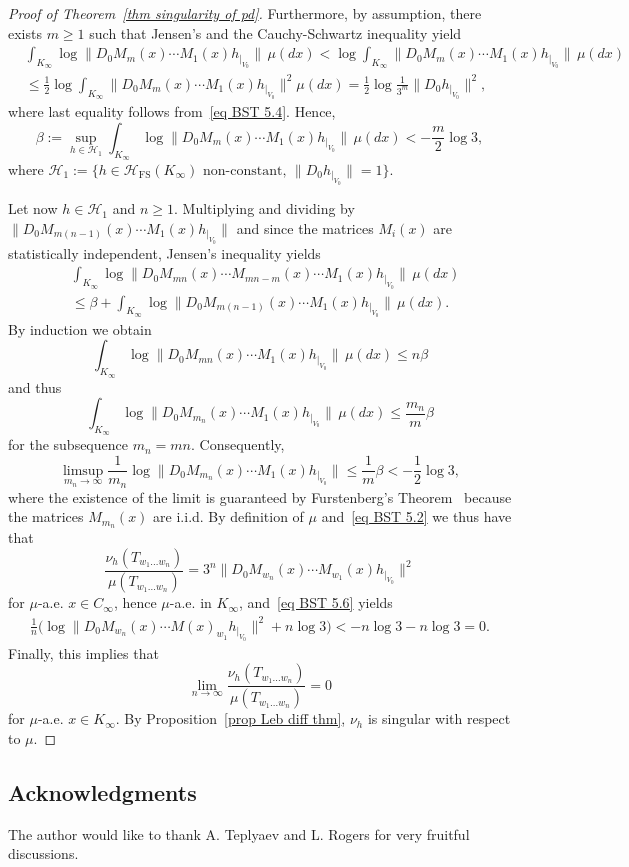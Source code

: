 \documentclass[11pt]{amsart}
\theoremstyle{definition}
\theoremstyle{remark}
\theoremstyle{example}
\numberwithin{equation}{section}
\begin{document}
\begin{proof}[Proof of Theorem~\ref{thm singularity of pd}]
Furthermore, by assumption, there exists $m\geq 1$ such that Jensen's and the Cauchy-Schwartz inequality yield
\begin{align*}
&\int_{K_\infty}\log\|D_0M_m(x)\cdots M_1(x)h_{|_{V_0}}\|\,\mu(dx)<\log \int_{K_\infty}\|D_0M_m(x)\cdots M_1(x)h_{|_{V_0}}\|\,\mu(dx)\\
&\leq\frac{1}{2}\log \int_{K_\infty}\|D_0M_m(x)\cdots M_1(x)h_{|_{V_0}}\|^2\mu(dx)=\frac{1}{2}\log \frac{1}{3^m}\|D_0h_{|_{V_0}}\|^2,
\end{align*}
where last equality follows from~\eqref{eq BST 5.4}. Hence, 
\begin{equation}\label{eq BST 5.5}
\beta:=\sup_{h\in{\mathcal{H}}_1}\int_{K_\infty}\log\|D_0M_m(x)\cdots M_1(x)h_{|_{V_0}}\|\,\mu(dx)<-\frac{m}{2}\log 3,
\end{equation}
where ${\mathcal{H}}_1:=\{h\in{\mathcal{H}}_\operatorname{FS}(K_\infty)\text{ non-constant, }\|D_0h_{|_{V_0}}\|=1\}$.

\medskip

Let now $h\in{\mathcal{H}}_1$ and $n\geq 1$. Multiplying and dividing by $\|D_0M_{m(n-1)}(x)\cdots M_1(x)h_{|_{V_0}}\|$ and since the matrices $M_i(x)$ are statistically independent, Jensen's inequality yields
\begin{align*}
&\int_{K_\infty}\log\|D_0M_{mn}(x)\cdots M_{mn-m}(x)\cdots M_1(x)h_{|_{V_0}}\|\,\mu(dx)\\
&\leq\beta+\int_{K_\infty}\log\|D_0M_{m(n-1)}(x)\cdots M_1(x)h_{|_{V_0}}\|\,\mu(dx).
\end{align*}
By induction we obtain
\[
\int_{K_\infty}\log\|D_0M_{mn}(x)\cdots  M_1(x)h_{|_{V_0}}\|\,\mu(dx)\leq n\beta
\]
and thus
\begin{equation}\label{eq BST 5.6}
\int_{K_\infty}\log\|D_0M_{m_n}(x)\cdots  M_1(x)h_{|_{V_0}}\|\,\mu(dx)\leq \frac{m_n}{m}\beta
\end{equation}
for the subsequence $m_n=mn$. Consequently,
\begin{equation}\label{eq bound limsup}
\limsup_{m_n\to\infty}\frac{1}{m_n}\log\|D_0M_{m_n}(x)\cdots  M_1(x)h_{|_{V_0}}\|\leq\frac{1}{m}\beta<-\frac{1}{2}\log 3,
\end{equation}
where the existence of the limit is guaranteed by Furstenberg's Theorem~\cite{Fur73} because the matrices $M_{m_n}(x)$ are i.i.d. By definition of $\mu$ and~\eqref{eq BST 5.2} we thus have that
\[
\frac{\nu_h(T_{w_1\ldots w_n})}{\mu(T_{w_1\ldots w_n})}=3^n\|D_0M_{w_n}(x)\cdots M_{w_1}(x)h_{|_{V_0}}\|^2
\]
for $\mu$-a.e. $x\in C_\infty$, hence $\mu$-a.e. in $K_\infty$, and~\eqref{eq BST 5.6} yields
\begin{align*}
\frac{1}{n}\big(\log \|D_0M_{w_n}(x)\cdots M(x)_{w_1}h_{|_{V_0}}\|^2+n\log 3\big)<-n\log 3-n\log 3=0.
\end{align*}
Finally, this implies that
\begin{equation}\label{eq BST 3.7}
\lim_{n\to\infty}\frac{\nu_h(T_{w_1\ldots w_n})}{\mu(T_{w_1\ldots w_n})}=0
\end{equation}
for $\mu$-a.e. $x\in K_\infty$. By Proposition~\ref{prop Leb diff thm}, $\nu_h$ is singular with respect to $\mu$.
\end{proof}
\subsection*{Acknowledgments}
The author would like to thank A. Teplyaev and L. Rogers for very fruitful discussions.


\end{document}
